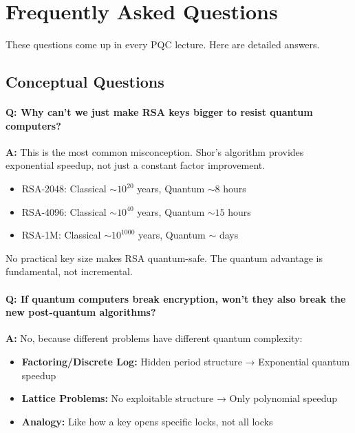 \documentclass[11pt,a4paper]{article}
\begin{document}
\section{Frequently Asked Questions}
\label{app:faq}

These questions come up in every PQC lecture. Here are detailed answers.

\subsection{Conceptual Questions}

\paragraph{Q: Why can't we just make RSA keys bigger to resist quantum computers?}

\textbf{A:} This is the most common misconception. Shor's algorithm provides exponential speedup, not just a constant factor improvement. 

\begin{itemize}
    \item RSA-2048: Classical $\sim 10^{20}$ years, Quantum $\sim 8$ hours
    \item RSA-4096: Classical $\sim 10^{40}$ years, Quantum $\sim 15$ hours  
    \item RSA-1M: Classical $\sim 10^{1000}$ years, Quantum $\sim$ days
\end{itemize}

No practical key size makes RSA quantum-safe. The quantum advantage is fundamental, not incremental.

\paragraph{Q: If quantum computers break encryption, won't they also break the new post-quantum algorithms?}

\textbf{A:} No, because different problems have different quantum complexity:

\begin{itemize}
    \item \textbf{Factoring/Discrete Log:} Hidden period structure → Exponential quantum speedup
    \item \textbf{Lattice Problems:} No exploitable structure → Only polynomial speedup
    \item \textbf{Analogy:} Like how a key opens specific locks, not all locks
\end{itemize}
\end{document}
